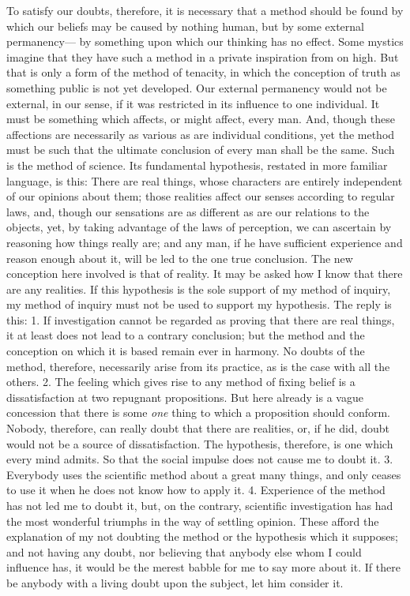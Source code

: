 To satisfy our doubts, therefore, it is necessary that a method should be found by which our beliefs may be caused by nothing human, but by some external permanency--- by something upon which our thinking has no effect. Some mystics imagine that they have such a method in a private inspiration from on high. But that is only a form of the method of tenacity, in which the conception of truth as something public is not yet developed. Our external permanency would not be external, in our sense, if it was restricted in its influence to one individual. It must be something which affects, or might affect, every man. And, though these affections are necessarily as various as are individual conditions, yet the method must be such that the ultimate conclusion of every man shall be the same. Such is the method of science. Its fundamental hypothesis, restated in more familiar language, is this: There are real things, whose characters are entirely independent of our opinions about them; those realities affect our senses according to regular laws, and, though our sensations are as different as are our relations to the objects, yet, by taking advantage of the laws of perception, we can ascertain by reasoning how things really are; and any man, if he have sufficient experience and reason enough about it, will be led to the one true conclusion. The new conception here involved is that of reality. It may be asked how I know that there are any realities. If this hypothesis is the sole support of my method of inquiry, my method of inquiry must not be used to support my hypothesis. The reply is this: 1. If investigation cannot be regarded as proving that there are real things, it at least does not lead to a contrary conclusion; but the method and the conception on which it is based remain ever in harmony. No doubts of the method, therefore, necessarily arise from its practice, as is the case with all the others. 2. The feeling which gives rise to any method of fixing belief is a dissatisfaction at two repugnant propositions. But here already is a vague concession that there is some \emph{one} thing to which a proposition should conform.  Nobody, therefore, can really doubt that there are realities, or, if he did, doubt would not be a source of dissatisfaction. The hypothesis, therefore, is one which every mind admits. So that the social impulse does not cause me to doubt it. 3. Everybody uses the scientific method about a great many things, and only ceases to use it when he does not know how to apply it. 4. Experience of the method has not led me to doubt it, but, on the contrary, scientific investigation has had the most wonderful triumphs in the way of settling opinion. These afford the explanation of my not doubting the method or the hypothesis which it supposes; and not having any doubt, nor believing that anybody else whom I could influence has, it would be the merest babble for me to say more about it. If there be anybody with a living doubt upon the subject, let him consider it.


